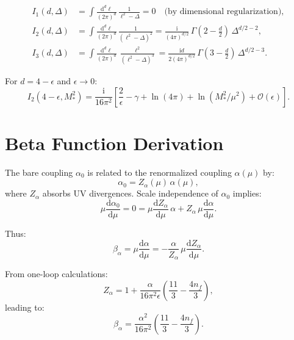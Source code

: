 \documentclass[11pt,a4paper]{article}
\numberwithin{equation}{section}
\theoremstyle{plain}
\theoremstyle{definition}
\theoremstyle{remark}
\newcommand{\dd}{\mathrm{d}}
\newcommand{\ii}{\mathrm{i}}
\begin{document}
\begin{align}
I_1(d,\Delta) &= \int \frac{\dd^d \ell}{(2\pi)^d}\,\frac{1}{\ell^2-\Delta} = 0 \quad\text{(by dimensional regularization)}, \label{eq:I1-master}\\
I_2(d,\Delta) &= \int \frac{\dd^d \ell}{(2\pi)^d}\,\frac{1}{(\ell^2-\Delta)^2} = \frac{\ii}{(4\pi)^{d/2}}\,\Gamma\left(2-\frac{d}{2}\right)\,\Delta^{d/2-2}, \label{eq:I2-master}\\
I_3(d,\Delta) &= \int \frac{\dd^d \ell}{(2\pi)^d}\,\frac{\ell^2}{(\ell^2-\Delta)^3} = \frac{\ii d}{2(4\pi)^{d/2}}\,\Gamma\left(3-\frac{d}{2}\right)\,\Delta^{d/2-3}. \label{eq:I3-master}
\end{align}

For $d=4-\epsilon$ and $\epsilon\to 0$:
\begin{equation}
I_2(4-\epsilon,M_*^2) = \frac{\ii}{16\pi^2}\left[\frac{2}{\epsilon} - \gamma + \ln(4\pi) + \ln(M_*^2/\mu^2) + \mathcal{O}(\epsilon)\right].
\label{eq:I2-d4}
\end{equation}

\section{Beta Function Derivation}\label{app:beta}

The bare coupling $\alpha_0$ is related to the renormalized coupling $\alpha(\mu)$ by:
\begin{equation}
\alpha_0 = Z_\alpha(\mu)\,\alpha(\mu),
\label{eq:alpha-bare}
\end{equation}
where $Z_\alpha$ absorbs UV divergences. Scale independence of $\alpha_0$ implies:
\begin{equation}
\mu\frac{\dd\alpha_0}{\dd\mu} = 0 = \mu\frac{\dd Z_\alpha}{\dd\mu}\,\alpha + Z_\alpha\,\mu\frac{\dd\alpha}{\dd\mu}.
\label{eq:bare-scale-indep}
\end{equation}

Thus:
\begin{equation}
\beta_\alpha = \mu\frac{\dd\alpha}{\dd\mu} = -\frac{\alpha}{Z_\alpha}\,\mu\frac{\dd Z_\alpha}{\dd\mu}.
\label{eq:beta-from-Z}
\end{equation}

From one-loop calculations:
\begin{equation}
Z_\alpha = 1 + \frac{\alpha}{16\pi^2\epsilon}\left(\frac{11}{3}-\frac{4n_f}{3}\right),
\label{eq:Z-alpha-1loop}
\end{equation}
leading to:
\begin{equation}
\beta_\alpha = \frac{\alpha^2}{16\pi^2}\left(\frac{11}{3}-\frac{4n_f}{3}\right).
\label{eq:beta-final}
\end{equation}
\end{document}
